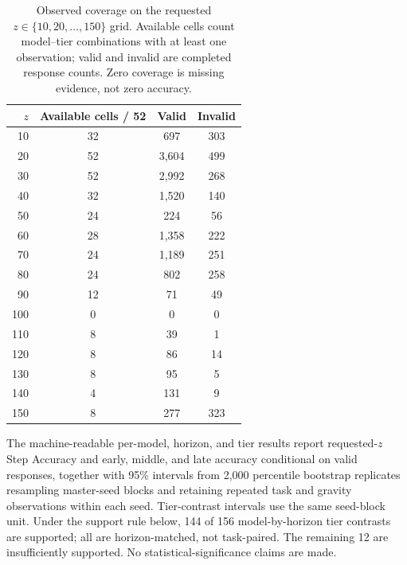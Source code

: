 \documentclass{article}
\begin{document}
\begin{table}[H]
\centering
\caption{Observed coverage on the requested $z\in\{10,20,\ldots,150\}$ grid. Available cells count model--tier combinations with at least one observation; valid and invalid are completed response counts. Zero coverage is missing evidence, not zero accuracy.}
\label{tab:extended_grid_coverage}
\scriptsize
\begin{tabular}{rccc}
\toprule
\textbf{$z$} & \textbf{Available cells / 52} & \textbf{Valid} & \textbf{Invalid} \\
\midrule
10 & 32 & 697 & 303 \\
20 & 52 & 3,604 & 499 \\
30 & 52 & 2,992 & 268 \\
40 & 32 & 1,520 & 140 \\
50 & 24 & 224 & 56 \\
60 & 28 & 1,358 & 222 \\
70 & 24 & 1,189 & 251 \\
80 & 24 & 802 & 258 \\
90 & 12 & 71 & 49 \\
100 & 0 & 0 & 0 \\
110 & 8 & 39 & 1 \\
120 & 8 & 86 & 14 \\
130 & 8 & 95 & 5 \\
140 & 4 & 131 & 9 \\
150 & 8 & 277 & 323 \\
\bottomrule
\end{tabular}
\end{table}

The machine-readable per-model, horizon, and tier results report requested-$z$
Step Accuracy and early, middle, and late accuracy conditional on valid
responses, together with 95\% intervals from 2,000 percentile bootstrap
replicates resampling master-seed blocks and retaining repeated task and
gravity observations within each seed. Tier-contrast intervals use the same
seed-block unit. Under the support rule below, 144 of 156 model-by-horizon
tier contrasts are supported; all are horizon-matched, not task-paired. The
remaining 12 are insufficiently supported. No statistical-significance claims
are made.
\end{document}

